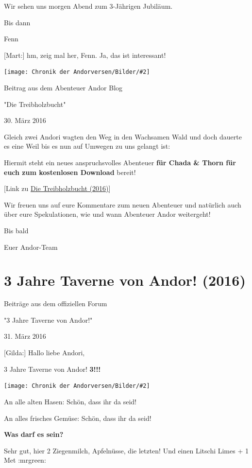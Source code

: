 \documentclass[10pt, a4paper, oneside]{book}
\newcommand{\fillbreak}{\vspace*{\fill}\columnbreak}
\newcommand{\storytext}[1]{%
    \section{#1}%
    \label{Storytext: #1}%
}
\newcommand{\reflegende}[1]{\hyperref[Legende: #1]{#1}}
\newcommand{\bildmitts}[2][height=0.32\textwidth,width=0.48\textwidth,keepaspectratio]{%
    \begin{center}
        \texttt{[image: Chronik der Andorversen/Bilder/\#2]}
    \end{center}
}
\begin{document}
\begin{multicols}{2}
Wir sehen uns morgen Abend zum 3-Jährigen Jubiläum.

Bis dann

Fenn

[Mart:] hm, zeig mal her, Fenn. Ja, das ist interessant!

\bildmitts{AA2016 Chadas Brief 2.jpeg}

\begin{center}
    Beitrag aus dem Abenteuer Andor Blog

    "Die Treibholzbucht"

    30. März 2016
\end{center}


Gleich zwei Andori wagten den Weg in den Wachsamen Wald und doch dauerte es eine Weil bis es nun auf Umwegen zu uns gelangt ist:


Hiermit steht ein neues anspruchsvolles Abenteuer \textbf{für Chada \& Thorn für euch zum kostenlosen Download} bereit!

[Link zu \reflegende{Die Treibholzbucht (2016)}]

Wir freuen uns auf eure Kommentare zum neuen Abenteuer und natürlich auch über eure Spekulationen, wie und wann Abenteuer Andor weitergeht!

Bis bald

Euer Andor-Team







\fillbreak
\storytext{3 Jahre Taverne von Andor! (2016)}

\begin{center}
    Beiträge aus dem offiziellen Forum

    "3 Jahre Taverne von Andor!"

    31. März 2016
\end{center}


[Gilda:] Hallo liebe Andori,

3 Jahre Taverne von Andor! \textbf{3!!!}

\bildmitts{AA2016 3 Jahre Taverne von Andor 1.jpeg}

An alle alten Hasen: Schön, dass ihr da seid!

An alles frisches Gemüse: Schön, dass ihr da seid!

\textbf{Was darf es sein?}

Sehr gut, hier 2 Ziegenmilch, Apfelnüsse, die letzten! Und einen Litschi Limes + 1 Met :mrgreen:


\end{multicols}
\end{document}

